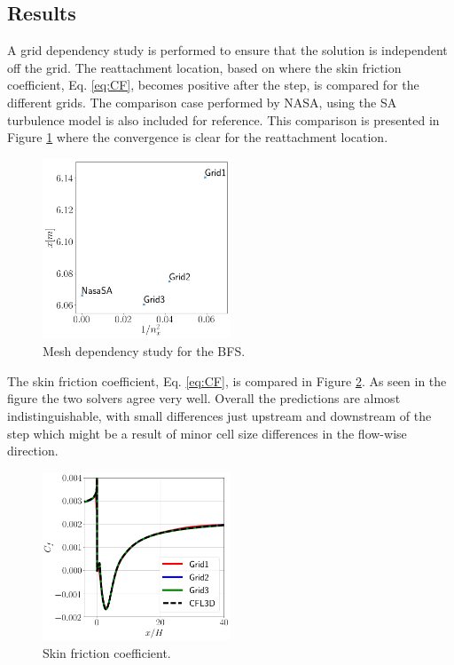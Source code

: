 \subsection{Results}
A grid dependency study is performed to ensure that the solution is independent off the grid. The reattachment location, based on where the skin friction coefficient, Eq. \ref{eq:CF}, becomes positive after the step, is compared for the different grids. The comparison case performed by NASA, using the SA turbulence model \cite{NASA} is also included for reference. This comparison is presented in Figure \ref{fig:BFSconstudy} where the convergence is clear for the reattachment location.
\begin{figure}[H]
  \centering
  \includegraphics[width=0.5\textwidth]{figures/BFSAttachment.png}
  \caption{Mesh dependency study for the BFS.} \label{fig:BFSconstudy}
\end{figure}
The skin friction coefficient, Eq. \ref{eq:CF}, is compared in Figure \ref{fig:BFSCF}. As seen in the figure the two solvers agree very well. Overall the predictions are almost indistinguishable, with small differences just upstream and downstream of the step which might be a result of minor cell size differences in the flow-wise direction.
\begin{figure}[H]
  \centering
  \includegraphics[width=0.5\textwidth]{figures/BFSCf.png}
  \caption{Skin friction coefficient.} \label{fig:BFSCF}
\end{figure}
